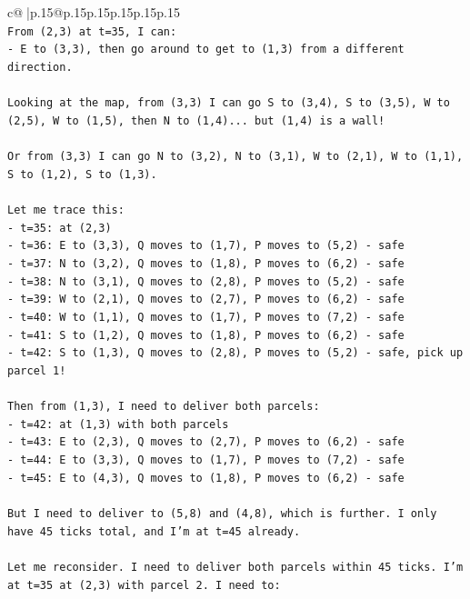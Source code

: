 \documentclass{article}
\begin{document}
{\begin{supertabular}{c@{$\;$}|p{.15\linewidth}@{}p{.15\linewidth}p{.15\linewidth}p{.15\linewidth}p{.15\linewidth}p{.15\linewidth}}
{{{\\ 
\texttt{From (2,3) at t=35, I can:} \\
\texttt{{-} E to (3,3), then go around to get to (1,3) from a different direction.} \\
\\ 
\texttt{Looking at the map, from (3,3) I can go S to (3,4), S to (3,5), W to (2,5), W to (1,5), then N to (1,4)... but (1,4) is a wall!} \\
\\ 
\texttt{Or from (3,3) I can go N to (3,2), N to (3,1), W to (2,1), W to (1,1), S to (1,2), S to (1,3).} \\
\\ 
\texttt{Let me trace this:} \\
\texttt{{-} t=35: at (2,3)} \\
\texttt{{-} t=36: E to (3,3), Q moves to (1,7), P moves to (5,2) {-} safe} \\
\texttt{{-} t=37: N to (3,2), Q moves to (1,8), P moves to (6,2) {-} safe} \\
\texttt{{-} t=38: N to (3,1), Q moves to (2,8), P moves to (5,2) {-} safe} \\
\texttt{{-} t=39: W to (2,1), Q moves to (2,7), P moves to (6,2) {-} safe} \\
\texttt{{-} t=40: W to (1,1), Q moves to (1,7), P moves to (7,2) {-} safe} \\
\texttt{{-} t=41: S to (1,2), Q moves to (1,8), P moves to (6,2) {-} safe} \\
\texttt{{-} t=42: S to (1,3), Q moves to (2,8), P moves to (5,2) {-} safe, pick up parcel 1!} \\
\\ 
\texttt{Then from (1,3), I need to deliver both parcels:} \\
\texttt{{-} t=42: at (1,3) with both parcels} \\
\texttt{{-} t=43: E to (2,3), Q moves to (2,7), P moves to (6,2) {-} safe} \\
\texttt{{-} t=44: E to (3,3), Q moves to (1,7), P moves to (7,2) {-} safe} \\
\texttt{{-} t=45: E to (4,3), Q moves to (1,8), P moves to (6,2) {-} safe} \\
\\ 
\texttt{But I need to deliver to (5,8) and (4,8), which is further. I only have 45 ticks total, and I'm at t=45 already.} \\
\\ 
\texttt{Let me reconsider. I need to deliver both parcels within 45 ticks. I'm at t=35 at (2,3) with parcel 2. I need to:} \\
}}}
\end{supertabular}}
\end{document}
